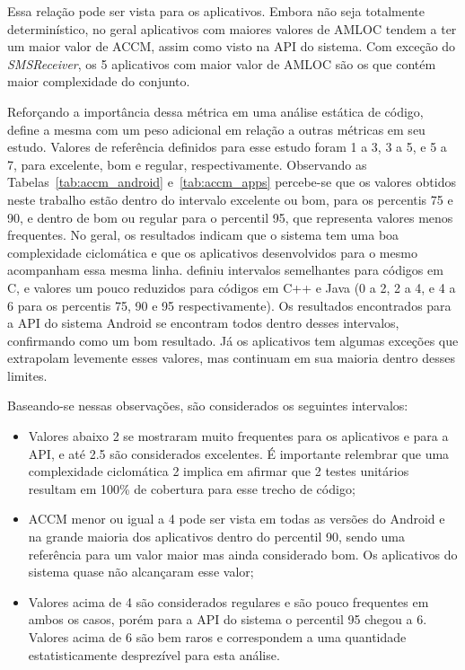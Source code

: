 Essa relação pode ser vista para os aplicativos. Embora não seja totalmente determinístico, no geral aplicativos com maiores valores de AMLOC tendem a ter um maior valor de ACCM, assim como visto na API do sistema. Com exceção do \textit{SMSReceiver}, os 5 aplicativos com maior valor de AMLOC são os que contém maior complexidade do conjunto. 

Reforçando a importância dessa métrica em uma análise estática de código,  define a mesma com um peso adicional em relação a outras métricas em seu estudo. Valores de referência definidos para esse estudo foram 1 a 3, 3 a 5, e 5 a 7, para excelente, bom e regular, respectivamente. Observando as Tabelas~\ref{tab:accm_android} e~\ref{tab:accm_apps} percebe-se que os valores obtidos neste trabalho estão dentro do intervalo excelente ou bom, para os percentis 75 e 90, e dentro de bom ou regular para o percentil 95, que representa valores menos frequentes. No geral, os resultados indicam que o sistema tem uma boa complexidade ciclomática e que os aplicativos desenvolvidos para o mesmo acompanham essa mesma linha.  definiu intervalos semelhantes para códigos em C, e valores um pouco reduzidos para códigos em C++ e Java (0 a 2, 2 a 4, e 4 a 6 para os percentis 75, 90 e 95 respectivamente).  Os resultados encontrados para a API do sistema Android se encontram todos dentro desses intervalos, confirmando como um bom resultado. Já os aplicativos tem algumas exceções que extrapolam levemente esses valores, mas continuam em sua maioria dentro desses limites.

Baseando-se nessas observações, são considerados os seguintes intervalos:

\begin{itemize}
\item Valores abaixo 2 se mostraram muito frequentes para os aplicativos e para a API, e até 2.5 são considerados excelentes. É importante relembrar que uma complexidade ciclomática 2 implica em afirmar que 2 testes unitários resultam em 100\% de cobertura para esse trecho de código;
\item ACCM menor ou igual a 4 pode ser vista em todas as versões do Android e na grande maioria dos aplicativos dentro do percentil 90, sendo uma referência para um valor maior mas ainda considerado bom. Os aplicativos do sistema quase não alcançaram esse valor;
\item Valores acima de 4 são considerados regulares e são pouco frequentes em ambos os casos, porém para a API do sistema o percentil 95 chegou a 6. Valores acima de 6 são bem raros e correspondem a uma quantidade estatisticamente desprezível para esta análise.
\end{itemize}

